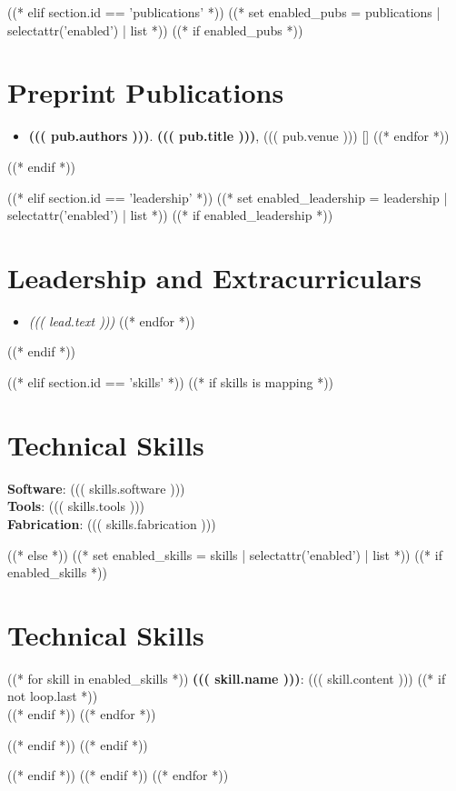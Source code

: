 \documentclass[a4paper,11pt]{article}
\begin{document}
((* elif section.id == 'publications' *))
((* set enabled_pubs = publications | selectattr('enabled') | list *))
((* if enabled_pubs *))
\section{Preprint Publications}
    \begin{itemize}[itemsep=-1pt, parsep=3pt]
((* for pub in enabled_pubs *))
        \item\small \textbf{((( pub.authors )))}. \textbf{((( pub.title )))}, ((( pub.venue ))) [\href{((( pub.link )))}{\color{blue}{Link}}]
((* endfor *))
    \end{itemize}
((* endif *))

((* elif section.id == 'leadership' *))
((* set enabled_leadership = leadership | selectattr('enabled') | list *))
((* if enabled_leadership *))
\section{Leadership and Extracurriculars}
    \begin{itemize}[itemsep=-5pt, parsep=3pt]
((* for lead in enabled_leadership *))
        \item \textit{((( lead.text )))}
((* endfor *))
    \end{itemize}
 \vspace{-16pt}
((* endif *))

((* elif section.id == 'skills' *))
((* if skills is mapping *))
\section{Technical Skills}
 \begin{itemize}[leftmargin=0.15in, label={}]
    \small{\item{
     \textbf{Software}{: ((( skills.software )))}   \\ \textbf{Tools}{: ((( skills.tools )))} \\
     \textbf{Fabrication}{: ((( skills.fabrication )))} \\
    }}
 \end{itemize}
 \vspace{-16pt}
((* else *))
((* set enabled_skills = skills | selectattr('enabled') | list *))
((* if enabled_skills *))
\section{Technical Skills}
 \begin{itemize}[leftmargin=0.15in, label={}]
    \small{\item{
((* for skill in enabled_skills *))
     \textbf{((( skill.name )))}{: ((( skill.content )))} ((* if not loop.last *))\\((* endif *))
((* endfor *))
    }}
 \end{itemize}
 \vspace{-16pt}
((* endif *))
((* endif *))

((* endif *))
((* endif *))
((* endfor *))
\end{document}
